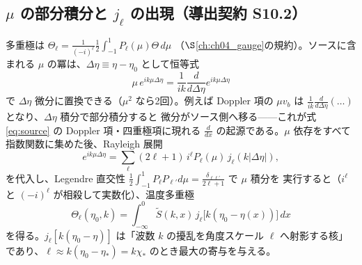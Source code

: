 \subsection{$\mu$ の部分積分と $j_\ell$ の出現（導出契約 S10.2）}
多重極は $\Theta_\ell=\frac{1}{(-i)^\ell}\frac{1}{2}\int_{-1}^1 P_\ell(\mu)\Theta\,d\mu$
（$\S$\ref{ch:ch04_gauge}の規約）。ソースに含まれる $\mu$ の冪は、$\Delta\eta\equiv\eta-\eta_0$
として恒等式
\begin{equation}
  \mu\,e^{ik\mu\Delta\eta}=\frac{1}{ik}\frac{d}{d\Delta\eta}e^{ik\mu\Delta\eta}
\end{equation}
で $\Delta\eta$ 微分に置換できる（$\mu^2$ なら2回）。例えば Doppler 項の $\mu v_b$ は
$\frac{1}{ik}\frac{d}{d\Delta\eta}(\ldots)$ となり、$\Delta\eta$ 積分で部分積分すると
微分がソース側へ移る——これが式\eqref{eq:source} の Doppler 項・四重極項に現れる
$\frac{d}{dx}$ の起源である。$\mu$ 依存をすべて指数関数に集めた後、Rayleigh 展開
\begin{equation}
  e^{ik\mu\Delta\eta}=\sum_{\ell}(2\ell+1)\,i^\ell P_\ell(\mu)\,j_\ell(k|\Delta\eta|),
\end{equation}
を代入し、Legendre 直交性
$\frac12\int_{-1}^1P_\ell P_{\ell'}d\mu=\frac{\delta_{\ell\ell'}}{2\ell+1}$ で $\mu$ 積分を
実行すると（$i^\ell$ と $(-i)^\ell$ が相殺して実数化）、温度多重極
\begin{equation}
  \boxed{\ \Theta_\ell(\eta_0,k)=\int_{-\infty}^{0}\tilde S(k,x)\,
  j_\ell\big[k(\eta_0-\eta(x))\big]\,dx\ }
  \label{eq:los}
\end{equation}
を得る。$j_\ell[k(\eta_0-\eta)]$ は「波数 $k$ の擾乱を角度スケール $\ell$ へ射影する核」
であり、$\ell\approx k(\eta_0-\eta_*)=k\chi_*$ のとき最大の寄与を与える。

